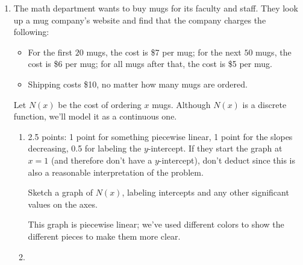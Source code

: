\documentclass{article}
\begin{document}
\begin{enumerate}
\item %
  The math department wants to buy mugs for its faculty and staff. They look up a mug company's website and find that the company charges the following:
  \begin{itemize}[nosep]
  \item For the first $20$ mugs, the cost is \$7 per mug; for the next $50$ mugs, the cost is \$6 per mug; for all mugs after that, the cost is \$5 per mug.
  \item Shipping costs \$10, no matter how many mugs are ordered. 
  \end{itemize}
  Let $N(x)$ be the cost of ordering $x$ mugs. Although $N(x)$ is a discrete function, we'll model it as a continuous one. 

  \begin{enumerate}

  \item

    \begin{grading}
      2.5 points: 1 point for something piecewise linear, 1 point for
      the slopes decreasing, 0.5 for labeling the $y$-intercept. If they start the graph at $x = 1$ (and therefore don't have a $y$-intercept), don't deduct since this is also a reasonable interpretation of the problem. 
    \end{grading} 

    \begin{problem}[\vfill]
      Sketch a graph of $N(x)$, labeling intercepts and any other significant values on the axes.
    \end{problem}    

    \begin{solution}
      This graph is piecewise linear; we've used different colors to show the different pieces to make them more clear.
      \begin{center}
      \end{center}
    \end{solution}

  \item


\end{enumerate}
\end{enumerate}
\end{document}

